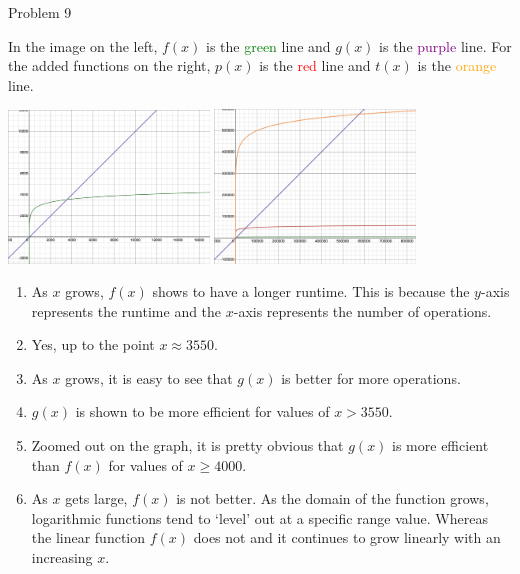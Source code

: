 \begin{problem}{Problem 9}
    \begin{highlight}[Solution]
        In the image on the left, $f(x)$ is the \textcolor{green}{green} line and $g(x)$ is the \textcolor{purple}{purple} line. For the added functions on the right, $p(x)$ is the \textcolor{red}{red} 
        line and $t(x)$ is the \textcolor{orange}{orange} line.
        \begin{center}
            \includegraphics[width = 0.4\textwidth]{./Images/Desmos 1.png}
            \hspace{20pt}
            \includegraphics[width = 0.4\textwidth]{./Images/Desmos 2.png}
        \end{center}
        
        \begin{enumerate}[label=(\alph*)]
            \item As $x$ grows, $f(x)$ shows to have a longer runtime. This is because the $y$-axis represents the runtime and the $x$-axis represents the number of operations.
            \item Yes, up to the point $x \approx 3550$.
            \item As $x$ grows, it is easy to see that $g(x)$ is better for more operations.
            \item $g(x)$ is shown to be more efficient for values of $x > 3550$.
            \item Zoomed out on the graph, it is pretty obvious that $g(x)$ is more efficient than $f(x)$ for values of $x \geq 4000$.
            \item As $x$ gets large, $f(x)$ is not better. As the domain of the function grows, logarithmic functions tend to `level' out at a specific range value. Whereas the linear function $f(x)$ does not
            and it continues to grow linearly with an increasing $x$.
        \end{enumerate}
    \end{highlight}
\end{problem}

